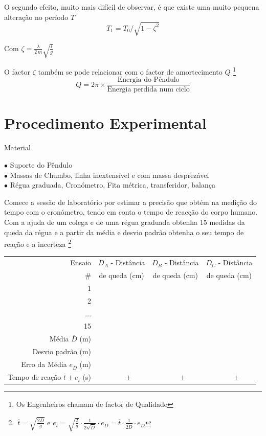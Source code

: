 \documentclass[a4paper,twoside,12pt]{article}      %
\begin{document}
O segundo efeito, muito mais difícil de observar, é que existe uma muito pequena alteração no período $T$
\begin{equation}
T_1= T_0 / \sqrt{1 - \zeta^2} 
\end{equation}

Com $ \zeta = \frac{\lambda}{2\, m} \sqrt{\frac{l}{g}}  $

O factor  $ \zeta $ também se pode relacionar com o factor de amortecimento $Q$ \footnote{Os Engenheiros chamam de factor de Qualidade} 
\begin{equation}
Q = 2 \pi \times \frac{\text{Energia do Pêndulo}}{\text{Energia perdida num ciclo}}
\end{equation}

\newpage
\section{\sf Procedimento Experimental}
{ \large Material }
 \begin{flushleft}
	 $\bullet$ Suporte do Pêndulo \\
	 $\bullet$ Massas de Chumbo, linha inextensível e com massa desprezável \\
	 $\bullet$ Régua graduada, Cronómetro, Fita métrica, transferidor, balança
\end{flushleft} 

Comece a sessão de laboratório por estimar a precisão que obtém na medição do tempo com o cronómetro, tendo em conta 
o tempo de reacção do corpo humano. 
Com a ajuda de um colega e de uma régua graduada obtenha 15 medidas da queda da régua e a partir da média e desvio padrão obtenha o seu tempo de reação e a incerteza \footnote{ $\,\overline{t}=\sqrt{\frac{2 \overline{D}}{g}}$ e   
$e_{\overline{t}}=\sqrt{\frac{2 }{g}} \cdot \frac{1}{2\sqrt{\overline{D}}} \cdot e_{\overline{D}}  
= \overline{t} \cdot \frac{1}{2\overline{D}} \cdot e_{\overline{D}} $ }

\begin{center}
\begin{tabular}{|r|c|c|c|}
\hline
Ensaio  & $D_A$ - Distância & $D_B$ - Distância & $D_C$ - Distância  \\
\# & de queda (cm) & de queda (cm) & de queda (cm)\\
\hline \hline
1 & & & \\
\hline
2 & &  &\\
\hline ... & & & \\
\hline 15 & & & \\
\hline \hline
Média $\overline{D}$ (m) & &  & \\
Desvio padrão (m) & & & \\
Erro da Média  $e_{\overline{D}}$ (m) & & & \\ 
Tempo de reação $\overline{t} \pm e_{\overline{t}}$ (s) & $\qquad \pm$  & $\qquad \pm$  & $\qquad \pm$  \\
\hline
\end{tabular}
\end{center}
\end{document}

